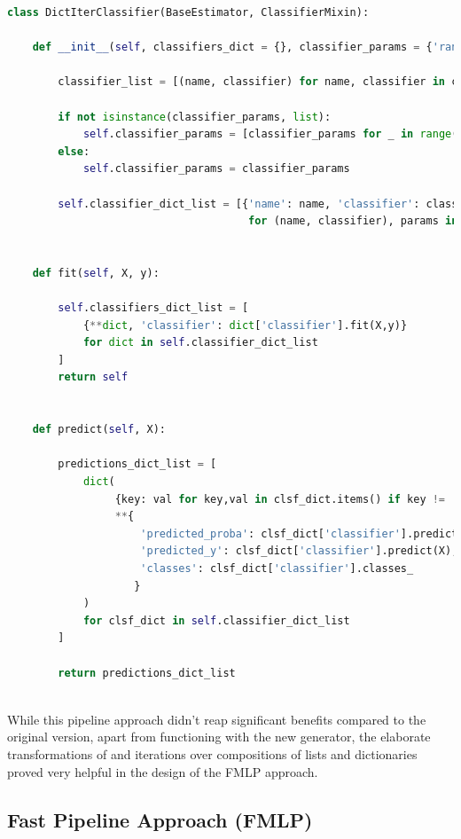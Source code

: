 \begin{lstlisting}[language=Python, numbers=none]
class DictIterClassifier(BaseEstimator, ClassifierMixin):

    def __init__(self, classifiers_dict = {}, classifier_params = {'random_state': 42}):

        classifier_list = [(name, classifier) for name, classifier in classifiers_dict.items()]

        if not isinstance(classifier_params, list):
            self.classifier_params = [classifier_params for _ in range(len(classifier_list))]
        else:
            self.classifier_params = classifier_params

        self.classifier_dict_list = [{'name': name, 'classifier': classifier(**params)}
                                      for (name, classifier), params in zip(classifier_list, self.classifier_params)]


    def fit(self, X, y):
        
        self.classifiers_dict_list = [
            {**dict, 'classifier': dict['classifier'].fit(X,y)} 
            for dict in self.classifier_dict_list
        ]
        return self
    

    def predict(self, X):
            
        predictions_dict_list = [
            dict(
                 {key: val for key,val in clsf_dict.items() if key != 'classifier'},
                 **{
                     'predicted_proba': clsf_dict['classifier'].predict_proba(X),
                     'predicted_y': clsf_dict['classifier'].predict(X),
                     'classes': clsf_dict['classifier'].classes_
                    }
            )
            for clsf_dict in self.classifier_dict_list
        ]
        
        return predictions_dict_list
        
\end{lstlisting}

While this pipeline approach didn't reap significant benefits compared to the original version, apart from functioning with the new generator, 
the elaborate transformations of and iterations over compositions of lists and dictionaries proved very helpful in the design of the FMLP approach.

\subsection{Fast Pipeline Approach (FMLP)}

